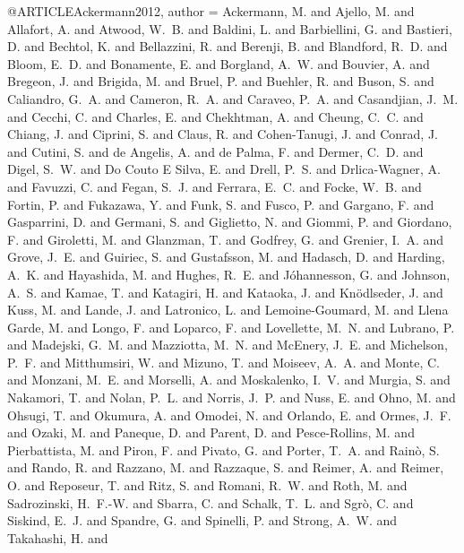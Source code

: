 \documentclass[useAMS,usenatbib]{mnras}
\begin{document}
{{{{{{@ARTICLE{Ackermann2012,
   author = {{Ackermann}, M. and {Ajello}, M. and {Allafort}, A. and {Atwood}, W.~B. and 
	{Baldini}, L. and {Barbiellini}, G. and {Bastieri}, D. and {Bechtol}, K. and 
	{Bellazzini}, R. and {Berenji}, B. and {Blandford}, R.~D. and 
	{Bloom}, E.~D. and {Bonamente}, E. and {Borgland}, A.~W. and 
	{Bouvier}, A. and {Bregeon}, J. and {Brigida}, M. and {Bruel}, P. and 
	{Buehler}, R. and {Buson}, S. and {Caliandro}, G.~A. and {Cameron}, R.~A. and 
	{Caraveo}, P.~A. and {Casandjian}, J.~M. and {Cecchi}, C. and 
	{Charles}, E. and {Chekhtman}, A. and {Cheung}, C.~C. and {Chiang}, J. and 
	{Ciprini}, S. and {Claus}, R. and {Cohen-Tanugi}, J. and {Conrad}, J. and 
	{Cutini}, S. and {de Angelis}, A. and {de Palma}, F. and {Dermer}, C.~D. and 
	{Digel}, S.~W. and {Do Couto E Silva}, E. and {Drell}, P.~S. and 
	{Drlica-Wagner}, A. and {Favuzzi}, C. and {Fegan}, S.~J. and 
	{Ferrara}, E.~C. and {Focke}, W.~B. and {Fortin}, P. and {Fukazawa}, Y. and 
	{Funk}, S. and {Fusco}, P. and {Gargano}, F. and {Gasparrini}, D. and 
	{Germani}, S. and {Giglietto}, N. and {Giommi}, P. and {Giordano}, F. and 
	{Giroletti}, M. and {Glanzman}, T. and {Godfrey}, G. and {Grenier}, I.~A. and 
	{Grove}, J.~E. and {Guiriec}, S. and {Gustafsson}, M. and {Hadasch}, D. and 
	{Harding}, A.~K. and {Hayashida}, M. and {Hughes}, R.~E. and 
	{J{\'o}hannesson}, G. and {Johnson}, A.~S. and {Kamae}, T. and 
	{Katagiri}, H. and {Kataoka}, J. and {Kn{\"o}dlseder}, J. and 
	{Kuss}, M. and {Lande}, J. and {Latronico}, L. and {Lemoine-Goumard}, M. and 
	{Llena Garde}, M. and {Longo}, F. and {Loparco}, F. and {Lovellette}, M.~N. and 
	{Lubrano}, P. and {Madejski}, G.~M. and {Mazziotta}, M.~N. and 
	{McEnery}, J.~E. and {Michelson}, P.~F. and {Mitthumsiri}, W. and 
	{Mizuno}, T. and {Moiseev}, A.~A. and {Monte}, C. and {Monzani}, M.~E. and 
	{Morselli}, A. and {Moskalenko}, I.~V. and {Murgia}, S. and 
	{Nakamori}, T. and {Nolan}, P.~L. and {Norris}, J.~P. and {Nuss}, E. and 
	{Ohno}, M. and {Ohsugi}, T. and {Okumura}, A. and {Omodei}, N. and 
	{Orlando}, E. and {Ormes}, J.~F. and {Ozaki}, M. and {Paneque}, D. and 
	{Parent}, D. and {Pesce-Rollins}, M. and {Pierbattista}, M. and 
	{Piron}, F. and {Pivato}, G. and {Porter}, T.~A. and {Rain{\`o}}, S. and 
	{Rando}, R. and {Razzano}, M. and {Razzaque}, S. and {Reimer}, A. and 
	{Reimer}, O. and {Reposeur}, T. and {Ritz}, S. and {Romani}, R.~W. and 
	{Roth}, M. and {Sadrozinski}, H.~F.-W. and {Sbarra}, C. and 
	{Schalk}, T.~L. and {Sgr{\`o}}, C. and {Siskind}, E.~J. and 
	{Spandre}, G. and {Spinelli}, P. and {Strong}, A.~W. and {Takahashi}, H. and 
}}}}}}}}
\end{document}
